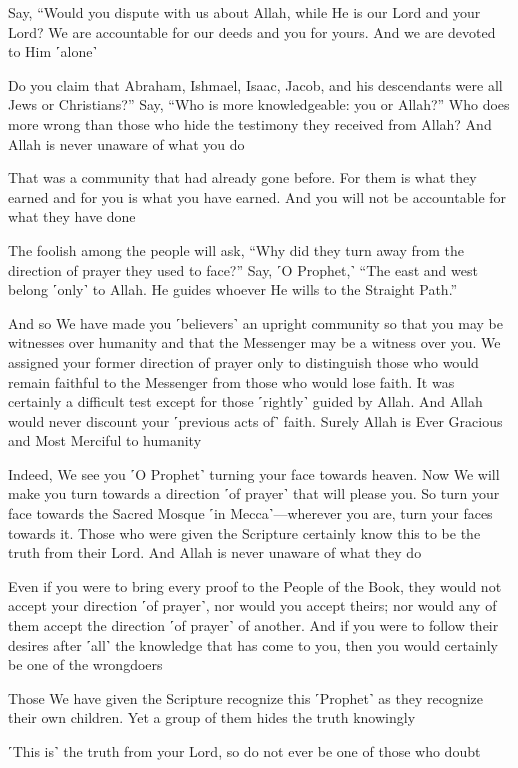 Say, “Would you dispute with us about Allah, while He is our Lord and your Lord? We are accountable for our deeds and you for yours. And we are devoted to Him ˹alone˺

Do you claim that Abraham, Ishmael, Isaac, Jacob, and his descendants were all Jews or Christians?” Say, “Who is more knowledgeable: you or Allah?” Who does more wrong than those who hide the testimony they received from Allah? And Allah is never unaware of what you do

That was a community that had already gone before. For them is what they earned and for you is what you have earned. And you will not be accountable for what they have done

The foolish among the people will ask, “Why did they turn away from the direction of prayer they used to face?” Say, ˹O Prophet,˺ “The east and west belong ˹only˺ to Allah. He guides whoever He wills to the Straight Path.”

And so We have made you ˹believers˺ an upright community so that you may be witnesses over humanity and that the Messenger may be a witness over you. We assigned your former direction of prayer only to distinguish those who would remain faithful to the Messenger from those who would lose faith. It was certainly a difficult test except for those ˹rightly˺ guided by Allah. And Allah would never discount your ˹previous acts of˺ faith. Surely Allah is Ever Gracious and Most Merciful to humanity

Indeed, We see you ˹O Prophet˺ turning your face towards heaven. Now We will make you turn towards a direction ˹of prayer˺ that will please you. So turn your face towards the Sacred Mosque ˹in Mecca˺—wherever you are, turn your faces towards it. Those who were given the Scripture certainly know this to be the truth from their Lord. And Allah is never unaware of what they do

Even if you were to bring every proof to the People of the Book, they would not accept your direction ˹of prayer˺, nor would you accept theirs; nor would any of them accept the direction ˹of prayer˺ of another. And if you were to follow their desires after ˹all˺ the knowledge that has come to you, then you would certainly be one of the wrongdoers

Those We have given the Scripture recognize this ˹Prophet˺ as they recognize their own children. Yet a group of them hides the truth knowingly

˹This is˺ the truth from your Lord, so do not ever be one of those who doubt

